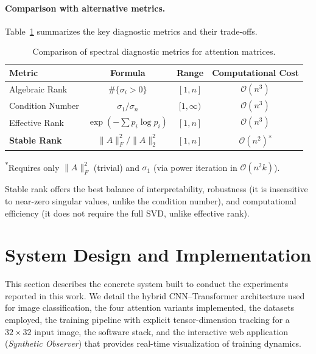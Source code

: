 \documentclass[12pt, a4paper]{article}
\begin{document}
\paragraph{Comparison with alternative metrics.}
Table~\ref{tab:metrics_comparison} summarizes the key diagnostic metrics
and their trade-offs.

\begin{table}[H]
\centering
\caption{Comparison of spectral diagnostic metrics for attention matrices.}
\label{tab:metrics_comparison}
\begin{tabular}{@{}lccc@{}}
\toprule
\textbf{Metric} & \textbf{Formula} & \textbf{Range} & \textbf{Computational Cost} \\
\midrule
Algebraic Rank  & $\#\{\sigma_i > 0\}$ & $[1, n]$ & $\mathcal{O}(n^3)$ \\
Condition Number & $\sigma_1 / \sigma_n$ & $[1, \infty)$ & $\mathcal{O}(n^3)$ \\
Effective Rank  & $\exp\!\left(-\sum p_i \log p_i\right)$ & $[1, n]$ & $\mathcal{O}(n^3)$ \\
\textbf{Stable Rank}  & $\|A\|_F^2 / \|A\|_2^2$ & $[1, n]$ & $\mathcal{O}(n^2)$\textsuperscript{*} \\
\bottomrule
\end{tabular}
\par\smallskip
\raggedright\small\textsuperscript{*}Requires only $\|A\|_F^2$ (trivial) and $\sigma_1$ (via power iteration in $\mathcal{O}(n^2 k)$).
\end{table}

Stable rank offers the best balance of interpretability, robustness (it
is insensitive to near-zero singular values, unlike the condition number),
and computational efficiency (it does not require the full SVD, unlike
effective rank).

\section{System Design and Implementation}

This section describes the concrete system built to conduct the
experiments reported in this work. We detail the hybrid
CNN--Transformer architecture used for image classification, the four
attention variants implemented, the datasets employed, the training
pipeline with explicit tensor-dimension tracking for a $32 \times 32$
input image, the software stack, and the interactive web application
(\textit{Synthetic Observer}) that provides real-time visualization of
training dynamics.
\end{document}
